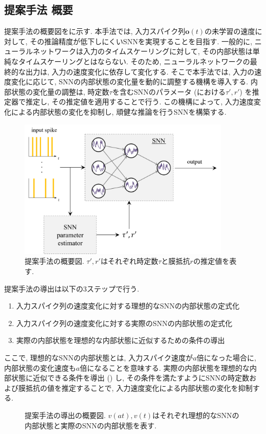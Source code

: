 \subsection{提案手法 概要}
提案手法の概要図をに示す.
本手法では, 入力スパイク列$\bm{o}(t)$の未学習の速度に対して, その推論精度が低下しにくいSNNを実現することを目指す.
一般的に, ニューラルネットワークは入力のタイムスケーリングに対して, その内部状態は単純なタイムスケーリングとはならない.
そのため, ニューラルネットワークの最終的な出力は, 入力の速度変化に依存して変化する.
そこで本手法では, 入力の速度変化に応じて, SNNの内部状態の変化量を動的に調整する機構を導入する.
内部状態の変化量の調整は, 時定数$\tau$を含むSNNのパラメータ (における$\tau', r'$) を推定器で推定し, その推定値を適用することで行う.
この機構によって, 入力速度変化による内部状態の変化を抑制し, 頑健な推論を行うSNNを構築する.

\begin{figure}[htb]
    \centering
    \includegraphics[width=0.9\textwidth]{Static/chap2_sec2_methodstr.png}
    \caption[提案手法の概要図]{
        提案手法の概要図.
        $\tau', r'$はそれぞれ時定数$\tau$と膜抵抗$r$の推定値を表す.
    }
    \label{fig:proposed_method}
\end{figure}

提案手法の導出は以下の3ステップで行う.
\begin{enumerate}
    \item 入力スパイク列の速度変化に対する理想的なSNNの内部状態の定式化
    \item 入力スパイク列の速度変化に対する実際のSNNの内部状態の定式化
    \item 実際の内部状態を理想的な内部状態に近似するための条件の導出
\end{enumerate}
ここで, 理想的なSNNの内部状態とは, 入力スパイク速度が$a$倍になった場合に, 内部状態の変化速度も$a$倍になることを意味する.
実際の内部状態を理想的な内部状態に近似できる条件を導出 () し, その条件を満たすようにSNNの時定数および膜抵抗の値を推定することで, 入力速度変化による内部状態の変化を抑制する.
\begin{figure}[htb]
    \centering
    
    \caption[提案手法の導出の概要図]{
        提案手法の導出の概要図.
        $v(at), v(t)$はそれぞれ理想的なSNNの内部状態と実際のSNNの内部状態を表す.
    }
    \label{fig:proposed_method_intro}
\end{figure}


